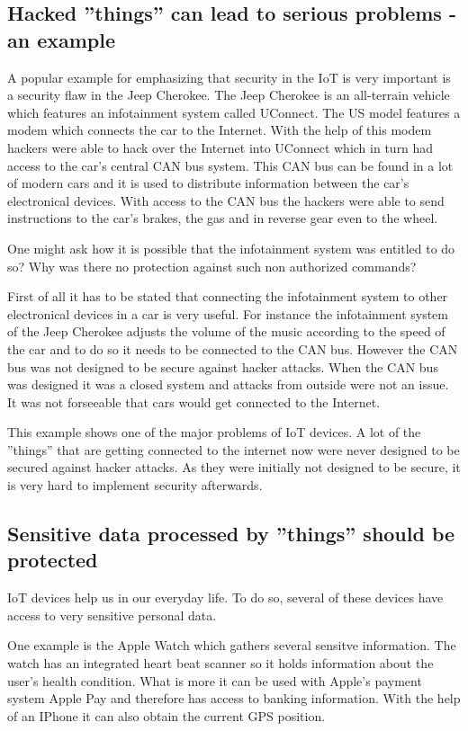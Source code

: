 \documentclass[conference]{IEEEtran}
\begin{document}
\subsection{Hacked ''things'' can lead to serious problems - an example}
A popular example for emphasizing that security in the IoT is very important is 
a security flaw in the Jeep Cherokee. The Jeep Cherokee is an all-terrain 
vehicle which features an infotainment system called UConnect. The US model 
features a modem which connects the car to the Internet. With the help of this 
modem hackers were able to hack over the Internet into UConnect which in turn 
had access to the car's central CAN bus system. This CAN bus can be found in a 
lot of modern cars and it is used to distribute information between the car's 
electronical devices. With access to the CAN bus the hackers were able to send 
instructions to the car's brakes, the gas and in reverse gear even to the 
wheel. \cite{ctArticle}

One might ask how it is possible that the infotainment system was entitled to 
do so? Why was there no protection against such non authorized commands?

First of all it has to be stated that connecting the infotainment system to 
other electronical devices in a car is very useful. For instance the 
infotainment system of the Jeep Cherokee adjusts the volume of the music 
according to the speed of the car and to do so it needs to be connected to the 
CAN bus. However the CAN bus was not designed to be secure against hacker 
attacks. When the CAN bus was designed it was a closed system and attacks from 
outside were not an issue. It was not forseeable that cars would get connected 
to the Internet.

This example shows one of the major problems of IoT devices. A lot of the 
''things'' that are getting connected to the internet now were never designed 
to be secured against hacker attacks. As they were initially not designed to be 
secure, it is very hard to implement security afterwards.

\subsection{Sensitive data processed by ''things'' should be protected}
IoT devices help us in our everyday life. To do so, several of these 
devices have access to very sensitive personal data. 

One example is the Apple Watch which gathers several sensitve information. The 
watch has an integrated heart beat scanner so it holds information about the 
user's health condition. What is more it can be used with Apple's payment 
system Apple Pay and therefore has access to banking information. With the help 
of an IPhone it can also obtain the current GPS position. 
\end{document}
